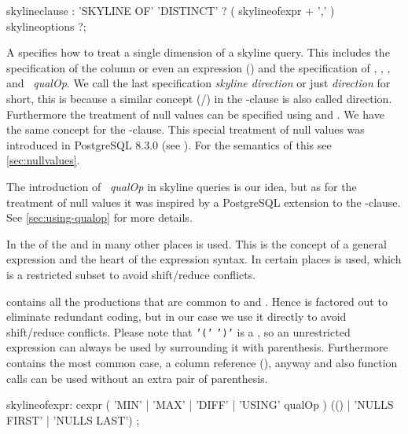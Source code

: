 \begin{rail}
skylineclause : 
    'SKYLINE OF' 'DISTINCT' ? ( skylineofexpr + ',' ) skylineoptions ?;
\end{rail}

A  specifies how to treat a single dimension
of a skyline query. This includes the specification of the column
or even an expression () and the specification of
, , , and 
~\emph{qualOp}. We call the last specification 
\emph{skyline direction} or just \emph{direction} for short, this
is because a similar concept (/) in the
-clause is also called direction.  Furthermore the
treatment of null values can be specified using  and .  We have the same concept for the
-clause. This special treatment of null values 
was introduced in PostgreSQL 8.3.0 (see
). For
the semantics of this see \autoref{sec:nullvalues}.

The introduction of ~\emph{qualOp} in skyline queries
is our idea, but as for the treatment of null values it was inspired
by a PostgreSQL extension to the -clause. See
\autoref{sec:using-qualop} for more details.

In the  of the  and in many other
places  is used. This is the concept of a general expression
and the heart of the expression syntax. In certain places 
is used, which is a restricted subset to avoid shift/reduce conflicts.

 contains all the productions that are common to 
and .  Hence  is factored out to eliminate redundant coding, but
in our case we use it directly to avoid shift/reduce conflicts. Please
note that \texttt{'('}  \texttt{')'} is a , so
an unrestricted expression can always be used by surrounding it with
parenthesis. Furthermore  contains the most common case, a column
reference (), anyway and also function calls can be used
without an extra pair of parenthesis.

\begin{rail}
skylineofexpr:
    cexpr ( 'MIN' | 'MAX' | 'DIFF' | 'USING' qualOp )
    (() | 'NULLS FIRST' | 'NULLS LAST') ;
\end{rail}

